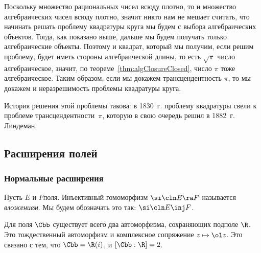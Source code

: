 \documentclass[a4paper]{article}
\begin{document}
Поскольку множество рациональных чисел всюду плотно, то и множество алгебраических чисел всюду плотно, значит
никто нам не мешает считать, что начинать решать проблему квадратуры круга мы будем с выбора алгебраических
объектов. Тогда, как показано выше, дальше мы будем получать только алгебраические объекты. Поэтому и
квадрат, который мы получим, если решим проблему, будет иметь стороны алгебраической длины, то есть $\sqrt{\pi}$\т
число алгебраическое, значит, по теореме~\ref{thm:algClosureClosed}, число $\pi$ тоже алгебраическое. Таким образом,
если мы докажем трансцендентность $\pi$, то мы докажем и неразрешимость проблемы квадратуры круга.

\begin{petit}
История решения этой проблемы такова: в 1830~г. проблему квадратуры свели к проблеме трансцендентности~$\pi$,
которую в свою очередь решил в 1882~г. Линдеман.
\end{petit}

\subsection{Расширения полей}

\subsubsection{Нормальные расширения}

\begin{df}
Пусть $E$ и $F$\т поля. Инъективный гомоморфизм $\si\cln E\ra F$ называется \emph{вложением}.
Мы будем обозначать это так: $\si\cln E \inj F$.
\end{df}

\begin{ex}
Для поля $\Cbb$ существует всего два автоморфизма, сохраняющих подполе $\R$.
Это тождественный автоморфизм и комплексное сопряжение $z \mapsto \ol z$.
Это связано с тем, что $\Cbb=\R(i)$, и $[\Cbb:\R] = 2$.
\end{ex}
\end{document}
